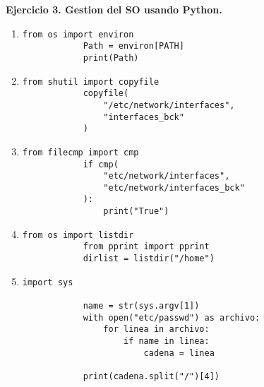 \documentclass{article}
\begin{document}
\textbf{Ejercicio 3. Gestion del SO usando Python.}
\begin{enumerate}
    \item
        \lstset{language=Python, texcl=true}
        \begin{lstlisting}[frame=single]
            from os import environ
            Path = environ[PATH]
            print(Path)
        \end{lstlisting}
    \item
        \lstset{language=Python, texcl=true}
        \begin{lstlisting}[frame=single]
            from shutil import copyfile
            copyfile(
                "/etc/network/interfaces",
                "interfaces_bck"
            )
        \end{lstlisting}
    \item
        \lstset{language=Python, texcl=true}
        \begin{lstlisting}[frame=single]
            from filecmp import cmp
            if cmp(
                "etc/network/interfaces",
                "etc/network/interfaces_bck"
            ):
                print("True")
        \end{lstlisting}
    \item
        \lstset{language=Python, texcl=true}
        \begin{lstlisting}[frame=single]
            from os import listdir
            from pprint import pprint
            dirlist = listdir("/home")
        \end{lstlisting}
    \item
        \lstset{language=Python, texcl=true}
        \begin{lstlisting}[frame=single]
            import sys
            
            name = str(sys.argv[1])
            with open("etc/passwd") as archivo:
                for linea in archivo:
                    if name in linea:
                        cadena = linea
            
            print(cadena.split("/")[4])
        \end{lstlisting}
\end{enumerate}
\end{document}
